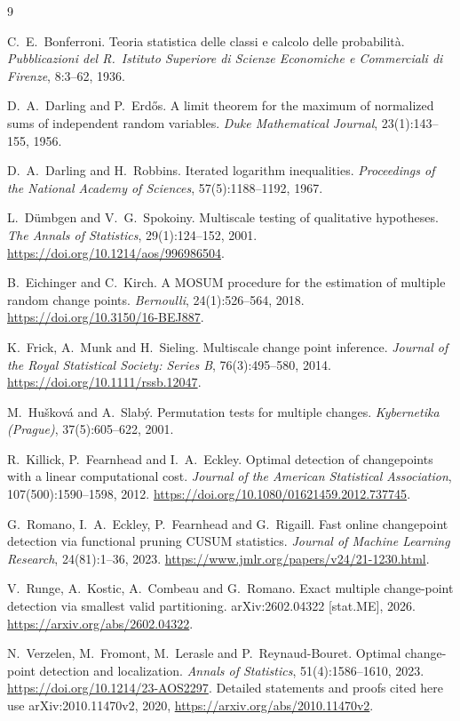 \documentclass[11pt]{article}
\begin{document}
\begin{thebibliography}{9}

C.~E.~Bonferroni.
\newblock Teoria statistica delle classi e calcolo delle probabilit\`a.
\newblock \emph{Pubblicazioni del R.~Istituto Superiore di Scienze
Economiche e Commerciali di Firenze}, 8:3--62, 1936.

D.~A.~Darling and P.~Erd\H{o}s.
\newblock A limit theorem for the maximum of normalized sums of
independent random variables.
\newblock \emph{Duke Mathematical Journal}, 23(1):143--155, 1956.

D.~A.~Darling and H.~Robbins.
\newblock Iterated logarithm inequalities.
\newblock \emph{Proceedings of the National Academy of Sciences},
57(5):1188--1192, 1967.

L.~D\"umbgen and V.~G.~Spokoiny.
\newblock Multiscale testing of qualitative hypotheses.
\newblock \emph{The Annals of Statistics}, 29(1):124--152, 2001.
\newblock \url{https://doi.org/10.1214/aos/996986504}.

B.~Eichinger and C.~Kirch.
\newblock A MOSUM procedure for the estimation of multiple random change
points.
\newblock \emph{Bernoulli}, 24(1):526--564, 2018.
\newblock \url{https://doi.org/10.3150/16-BEJ887}.

K.~Frick, A.~Munk and H.~Sieling.
\newblock Multiscale change point inference.
\newblock \emph{Journal of the Royal Statistical Society: Series B},
76(3):495--580, 2014.
\newblock \url{https://doi.org/10.1111/rssb.12047}.

M.~Hu\v{s}kov\'a and A.~Slab\'y.
\newblock Permutation tests for multiple changes.
\newblock \emph{Kybernetika (Prague)}, 37(5):605--622, 2001.

R.~Killick, P.~Fearnhead and I.~A.~Eckley.
\newblock Optimal detection of changepoints with a linear computational cost.
\newblock \emph{Journal of the American Statistical Association},
107(500):1590--1598, 2012.
\newblock \url{https://doi.org/10.1080/01621459.2012.737745}.

G.~Romano, I.~A.~Eckley, P.~Fearnhead and G.~Rigaill.
\newblock Fast online changepoint detection via functional pruning CUSUM
statistics.
\newblock \emph{Journal of Machine Learning Research}, 24(81):1--36, 2023.
\newblock \url{https://www.jmlr.org/papers/v24/21-1230.html}.

V.~Runge, A.~Kostic, A.~Combeau and G.~Romano.
\newblock Exact multiple change-point detection via smallest valid
partitioning.
\newblock arXiv:2602.04322 [stat.ME], 2026.
\newblock \url{https://arxiv.org/abs/2602.04322}.

N.~Verzelen, M.~Fromont, M.~Lerasle and P.~Reynaud-Bouret.
\newblock Optimal change-point detection and localization.
\newblock \emph{Annals of Statistics}, 51(4):1586--1610, 2023.
\newblock \url{https://doi.org/10.1214/23-AOS2297}.
\newblock Detailed statements and proofs cited here use arXiv:2010.11470v2,
2020, \url{https://arxiv.org/abs/2010.11470v2}.

\end{thebibliography}
\end{document}
